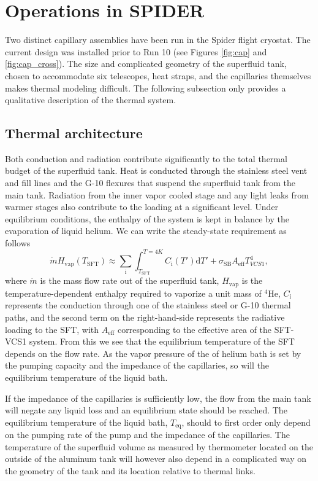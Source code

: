 \documentclass[
12pt, %
letterpaper, %
oneside, %
headinclude, footinclude, %
BCOR5mm, %
]{scrartcl}
\newcommand{\hen}{$^4\mathrm{He}$}
\newcommand{\spider}{{\sc Spider} }
\newcommand{\mrm}[1]{\mathrm{#1}}
\begin{document}
\section{Operations in SPIDER}

Two distinct capillary assemblies have been run in the \spider flight cryostat. The current design was installed prior to Run 10 (see Figures \ref{fig:cap} and \ref{fig:cap_cross}). The size and complicated geometry of the superfluid tank, chosen to accommodate six telescopes, heat straps, and the capillaries themselves makes thermal modeling difficult. The following subsection only provides a qualitative description of the thermal system.

\subsection{Thermal architecture}
Both conduction and radiation contribute significantly to the total thermal budget of the superfluid tank. Heat is conducted through the stainless steel vent and fill lines and the G-10 flexures that suspend the superfluid tank from the main tank. Radiation from the inner vapor cooled stage and any light leaks from warmer stages also contribute to the loading at a significant level. Under equilibrium conditions, the enthalpy of the system is kept in balance by the evaporation of liquid helium. We can write the steady-state requirement as follows
\begin{equation}
\dot{m} H_\mrm{vap}(T_\mrm{SFT}) \approx \sum _{\mrm{i}}\int _{T_\mrm{SFT}}^{T = 4 K}  C_\mrm{i} (T')\mrm{d}T' + \sigma _\mrm{SB} A_\mrm{eff}T_{VCS1}^4,
\label{eq:mdot}
\end{equation}
where $\dot{m}$ is the mass flow rate out of the superfluid tank, $H_\mrm{vap}$ is the temperature-dependent enthalpy required to vaporize a unit mass of \hen, $C_\mrm{i}$ represents the conduction through one of the stainless steel or G-10 thermal paths, and the second term on the right-hand-side represents the radiative loading to the SFT, with $A_\mrm{eff}$ corresponding to the effective area of the SFT-VCS1 system. From this we see that the equilibrium temperature of the SFT depends on the flow rate. As the vapor pressure of the of helium bath is set by the pumping capacity and the impedance of the capillaries, so will the equilibrium temperature of the liquid bath.

If the impedance of the capillaries is sufficiently low, the flow from the main tank will negate any liquid loss and an equilibrium state should be reached. The equilibrium temperature of the liquid bath, $T_\mrm{eq}$, should to first order only depend on the pumping rate of the pump and the impedance of the capillaries. The temperature of the superfluid volume as measured by thermometer located on the outside of the aluminum tank will however also depend in a complicated way on the geometry of the tank and its location relative to thermal links. %
\end{document}
